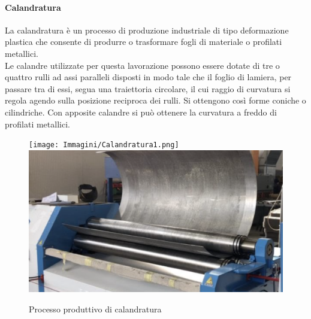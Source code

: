 \paragraph{Calandratura} La calandratura è un processo di produzione industriale di tipo deformazione plastica che consente di produrre o trasformare fogli di materiale o profilati metallici.\\
Le calandre utilizzate per questa lavorazione possono essere dotate di tre o quattro rulli ad assi paralleli disposti in modo tale che il foglio di lamiera, per passare tra di essi, segua una traiettoria circolare, il cui raggio di curvatura si regola agendo sulla posizione reciproca dei rulli. Si ottengono così forme coniche o cilindriche. Con apposite calandre si può ottenere la curvatura a freddo di profilati metallici.\\
\begin{figure}[h]
    \centering
    \texttt{[image: Immagini/Calandratura1.png]}
    \includegraphics[scale=0.3]{Immagini/Calandratura2.png}
    \caption{Processo produttivo di calandratura}
    \label{fig:Calandratura}
\end{figure}
